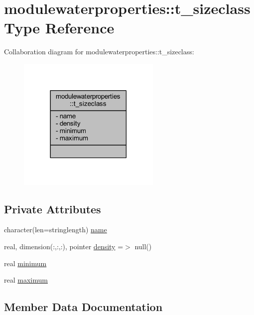 \hypertarget{structmodulewaterproperties_1_1t__sizeclass}{}\section{modulewaterproperties\+:\+:t\+\_\+sizeclass Type Reference}
\label{structmodulewaterproperties_1_1t__sizeclass}


Collaboration diagram for modulewaterproperties\+:\+:t\+\_\+sizeclass\+:\nopagebreak
\begin{figure}[H]
\begin{center}
\leavevmode
\includegraphics[width=194pt]{structmodulewaterproperties_1_1t__sizeclass__coll__graph}
\end{center}
\end{figure}
\subsection*{Private Attributes}
\begin{DoxyCompactItemize}
\item 
character(len=stringlength) \mbox{\hyperlink{structmodulewaterproperties_1_1t__sizeclass_a168ff62e040cff4b050202e59c10a5a5}{name}}
\item 
real, dimension(\+:,\+:,\+:), pointer \mbox{\hyperlink{structmodulewaterproperties_1_1t__sizeclass_aa69beb0f3690e35cfaa6b5ef675b260b}{density}} =$>$ null()
\item 
real \mbox{\hyperlink{structmodulewaterproperties_1_1t__sizeclass_aa84f1bfab92da88abee431dd120204aa}{minimum}}
\item 
real \mbox{\hyperlink{structmodulewaterproperties_1_1t__sizeclass_a32ce1c702e9079995b769295baa2242c}{maximum}}
\end{DoxyCompactItemize}


\subsection{Member Data Documentation}
\mbox{\label{structmodulewaterproperties_1_1t__sizeclass_aa69beb0f3690e35cfaa6b5ef675b260b}} 
